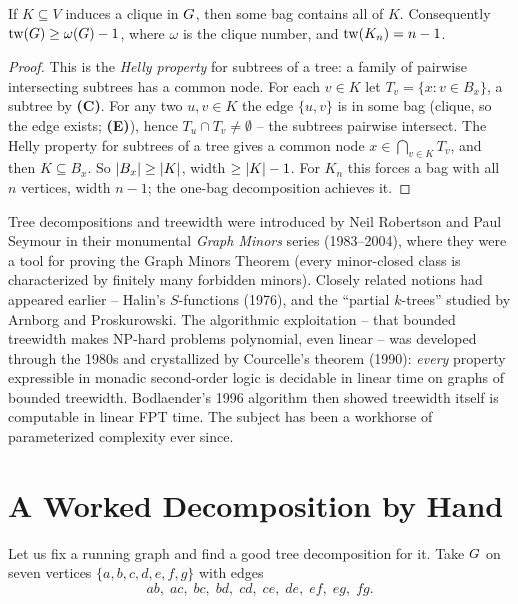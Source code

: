 \begin{proposition}
\label{ch24:prop-clique}
If $K\subseteq V$ induces a clique in $G$, then some bag contains all of $K$.
Consequently $\operatorname{tw}(G)\ge \omega(G)-1$, where $\omega$ is the clique number,
and $\operatorname{tw}(K_n)=n-1$.
\end{proposition}

\begin{proof}
This is the \emph{Helly property} for subtrees of a tree: a family of pairwise
intersecting subtrees has a common node. For each $v\in K$ let $T_v=\{x:v\in
B_x\}$, a subtree by \textbf{(C)}. For any two $u,v\in K$ the edge $\{u,v\}$ is in
some bag (clique, so the edge exists; \textbf{(E)}), hence $T_u\cap T_v\ne
\emptyset$ -- the subtrees pairwise intersect. The Helly property for subtrees of
a tree gives a common node $x\in\bigcap_{v\in K} T_v$, and then $K\subseteq B_x$.
So $\lvert B_x\rvert\ge\lvert K\rvert$, width $\ge\lvert K\rvert-1$. For $K_n$ this forces a bag with all
$n$ vertices, width $n-1$; the one-bag decomposition achieves it.
\end{proof}

\begin{historybox}
Tree decompositions and treewidth were introduced by Neil Robertson and Paul
Seymour in their monumental \emph{Graph Minors} series (1983--2004), where they
were a tool for proving the Graph Minors Theorem (every minor-closed class is
characterized by finitely many forbidden minors). Closely related notions had
appeared earlier -- Halin's $S$-functions (1976), and the ``partial $k$-trees''
studied by Arnborg and Proskurowski. The algorithmic exploitation -- that
bounded treewidth makes NP-hard problems polynomial, even linear -- was developed
through the 1980s and crystallized by Courcelle's theorem (1990): \emph{every}
property expressible in monadic second-order logic is decidable in linear time on
graphs of bounded treewidth. Bodlaender's 1996 algorithm then showed treewidth
itself is computable in linear FPT time. The subject has been a workhorse of
parameterized complexity ever since.
\end{historybox}

\section{A Worked Decomposition by Hand}
\label{ch24:worked-decomp}

Let us fix a running graph and find a good tree decomposition for it. Take
$G$ on seven vertices $\{a,b,c,d,e,f,g\}$ with edges
\[
  ab,\; ac,\; bc,\; bd,\; cd,\; ce,\; de,\; ef,\; eg,\; fg.
\]

